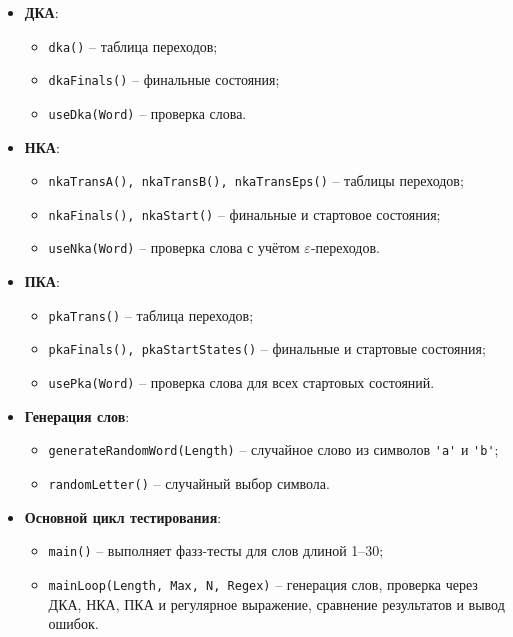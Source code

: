 \documentclass[a4paper,12pt]{article}
\begin{document}
\begin{itemize}[parsep=-1pt]
    \item \textbf{ДКА}:
    \begin{itemize}[parsep=-1pt]
        \item \verb|dka()| -- таблица переходов;
        \item \verb|dkaFinals()| -- финальные состояния;
        \item \verb|useDka(Word)| -- проверка слова.
    \end{itemize}

    \item \textbf{НКА}:
    \begin{itemize}[parsep=-1pt]
        \item \verb|nkaTransA(), nkaTransB(), nkaTransEps()| -- таблицы переходов;
        \item \verb|nkaFinals(), nkaStart()| -- финальные и стартовое состояния;
        \item \verb|useNka(Word)| -- проверка слова с учётом $\varepsilon$-переходов.
    \end{itemize}

    \item \textbf{ПКА}:
    \begin{itemize}[parsep=-1pt]
        \item \verb|pkaTrans()| -- таблица переходов;
        \item \verb|pkaFinals(), pkaStartStates()| -- финальные и стартовые состояния;
        \item \verb|usePka(Word)| -- проверка слова для всех стартовых состояний.
    \end{itemize}

    \item \textbf{Генерация слов}:
    \begin{itemize}[parsep=-1pt]
        \item \verb|generateRandomWord(Length)| -- случайное слово из символов \verb|'a'| и \verb|'b'|;
        \item \verb|randomLetter()| -- случайный выбор символа.
    \end{itemize}

    \item \textbf{Основной цикл тестирования}:
    \begin{itemize}[parsep=-1pt]
        \item \verb|main()| -- выполняет фазз-тесты для слов длиной 1--30;
        \item \verb|mainLoop(Length, Max, N, Regex)| -- генерация слов, проверка через ДКА, НКА, ПКА и регулярное выражение, сравнение результатов и вывод ошибок.
    \end{itemize}
\end{itemize}
\end{document}
